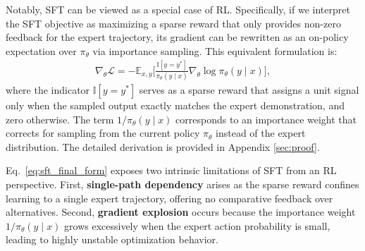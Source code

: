 Notably, SFT can be viewed as a special case of RL. Specifically, if we interpret the SFT objective as maximizing a sparse reward that only provides non-zero feedback for the expert trajectory, its gradient can be rewritten as an on-policy expectation over $\pi_{\theta}$ via importance sampling. This equivalent formulation is:
\begin{equation}
\begin{split}
    \nabla_{\theta}\mathcal{L}
    =
    -\mathbb{E}_{x, y}
    \Big[
    \frac{\mathbb{I}[y=y^{*}]}{\pi_{\theta}(y\mid x)}
    \nabla_{\theta}\log \pi_{\theta}(y\mid x)
    \Big],
\end{split}
\label{eq:sft_final_form}
\end{equation}
where the indicator $\mathbb{I}[y=y^{*}]$ serves as a sparse reward that assigns a unit signal only when the sampled output exactly matches the expert demonstration, and zero otherwise. The term $1/\pi_{\theta}(y\mid x)$ corresponds to an importance weight that corrects for sampling from the current policy $\pi_{\theta}$ instead of the expert distribution.
The detailed derivation is provided in Appendix \ref{sec:proof}.

Eq.~\eqref{eq:sft_final_form} exposes two intrinsic limitations of SFT from an RL perspective. First, \textbf{single-path dependency} arises as the sparse reward confines learning to a single expert trajectory, offering no comparative feedback over alternatives. Second, \textbf{gradient explosion} occurs because the importance weight $1/\pi_{\theta}(y\mid x)$ grows excessively when the expert action probability is small, leading to highly unstable optimization behavior.






